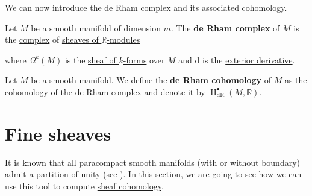 \documentclass[../../main]{subfiles}
\begin{document}
We can now introduce the de Rham complex and its associated cohomology.

\begin{definition} \label{def:de-rham-complex}
  Let \(M\) be a smooth manifold of dimension \(m\).
  The \textbf{de Rham complex} of \(M\) is the \hyperref[def:complex]{complex} of \hyperref[def:sheaf]{sheaves of \(\mathbb{R}\)-modules}
  \begin{center}
  \end{center}
  where \(\Omega^{k}(M)\) is the \hyperref[def:smooth-k-form]{sheaf of \(k\)-forms} over \(M\) and \(\mathrm{d}\) is the \hyperref[def:exterior-derivative-k-form]{exterior derivative}.
\end{definition}

\begin{definition}\label{def:de-rham-cohomology}
  Let \(M\) be a smooth manifold.
  We define the \textbf{de Rham cohomology} of \(M\) as the \hyperref[def:cohomology]{cohomology} of the \hyperref[def:de-rham-complex]{de Rham complex} and denote it by \(\operatorname{H}_{\operatorname{dR}}^{\bullet}(M, \mathbb{R})\).
\end{definition}


\section{Fine sheaves}

It is known that all paracompact smooth manifolds (with or without boundary) admit a partition of unity (see \cite[Theorem 2.23]{leeIntroductionSmoothManifolds2012}).
In this section, we are going to see how we can use this tool to compute \hyperref[def:sheaf-cohomology]{sheaf cohomology}.
\end{document}
